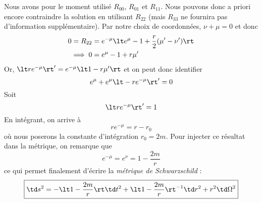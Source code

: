 Nous avons pour le moment utilisé $R_{00}$, $R_{01}$ et $R_{11}$. Nous pouvons donc a priori encore contraindre la solution en utilisant $R_{22}$ (mais $R_{33}$ ne fournira pas d'information supplémentaire). Par notre choix de coordonnées, $\nu + \mu = 0$ et donc
\begin{align}
    0 = R_{22} &= e^{-\mu} \lt e^\mu - 1 + \frac{r}{2} (\mu' - \nu')\rt \\
    \implies 0 & =  e^\mu -1 + r \mu'
\end{align}
Or, $\lt r e^{-\mu}\rt' = e^{-\mu} \lt 1 - r \mu'\rt$ et on peut donc identifier
\begin{equation}
    e^\mu + e^\mu \lt -r e^{-\mu} \rt' = 0
\end{equation}
Soit
\begin{equation}
    \lt r e^{-\mu} \rt' = 1
\end{equation}
En intégrant, on arrive à 
\begin{equation}
    r e^{-\mu} = r - r_0
\end{equation}
où nous poserons la constante d'intégration $r_0 = 2 m$. Pour injecter ce résultat dans la métrique, on remarque que
\begin{equation}
    e^{-\mu} = e^\nu = 1 - \frac{2m}{r}
\end{equation}
ce qui permet finalement d'écrire la \emph{métrique de Schwarzschild} :
\begin{align}
    \label{métrique de Schwarzschild}
    \boxed{\td s^2 = - \lt 1 - \frac{2m}{r} \rt \td t^2 + \lt 1 - \frac{2m}{r} \rt^{-1} \td r^2 + r^2 \td \Omega^2}
\end{align}
